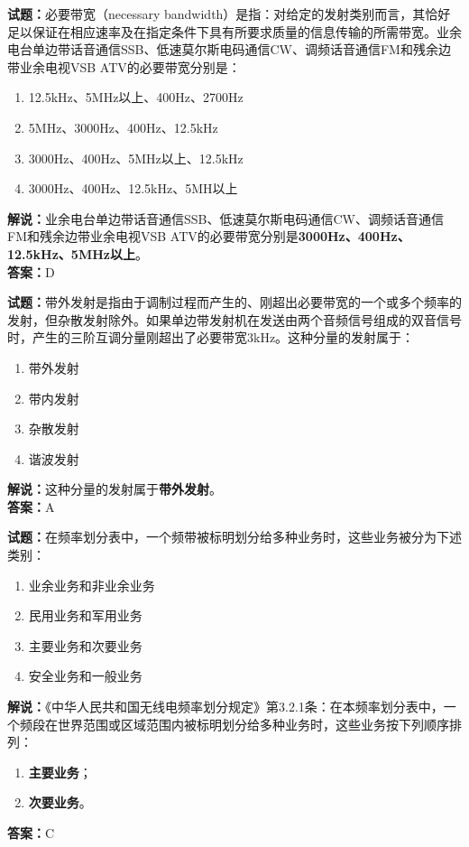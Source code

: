 \documentclass{ctexbook}
\begin{document}
\noindent\textbf{试题：}必要带宽（necessary bandwidth）是指：对给定的发射类别而言，其恰好足以保证在相应速率及在指定条件下具有所要求质量的信息传输的所需带宽。业余电台单边带话音通信SSB、低速莫尔斯电码通信CW、调频话音通信FM和残余边带业余电视VSB ATV的必要带宽分别是：
\begin{enumerate}[leftmargin=3em]
\item 12.5\unit{\kHz}、5\unit{\MHz}以上、400Hz、2700Hz
\item 5\unit{\MHz}、3000Hz、400Hz、12.5\unit{\kHz}
\item 3000Hz、400Hz、5\unit{\MHz}以上、12.5\unit{\kHz}
\item 3000Hz、400Hz、12.5\unit{\kHz}、5MH以上
\end{enumerate}
\noindent\textbf{解说：}业余电台单边带话音通信SSB、低速莫尔斯电码通信CW、调频话音通信FM和残余边带业余电视VSB ATV的必要带宽分别是\textbf{3000Hz、400Hz、12.5\unit{\kHz}、5\unit{\MHz}以上}。\\\noindent\textbf{答案：}D

\bigskip




\noindent\textbf{试题：}带外发射是指由于调制过程而产生的、刚超出必要带宽的一个或多个频率的发射，但杂散发射除外。如果单边带发射机在发送由两个音频信号组成的双音信号时，产生的三阶互调分量刚超出了必要带宽3\unit{\kHz}。这种分量的发射属于：
\begin{enumerate}[leftmargin=3em]
\item 带外发射
\item 带内发射
\item 杂散发射
\item 谐波发射
\end{enumerate}
\noindent\textbf{解说：}这种分量的发射属于\textbf{带外发射}。\\\noindent\textbf{答案：}A


\bigskip




\noindent\textbf{试题：}在频率划分表中，一个频带被标明划分给多种业务时，这些业务被分为下述类别：
\begin{enumerate}[leftmargin=3em]
\item 业余业务和非业余业务
\item 民用业务和军用业务
\item 主要业务和次要业务
\item 安全业务和一般业务
\end{enumerate}
\noindent\textbf{解说：}《中华人民共和国无线电频率划分规定》第3.2.1条：在本频率划分表中，一个频段在世界范围或区域范围内被标明划分给多种业务时，这些业务按下列顺序排列：
\begin{enumerate}[leftmargin=3em, label=\alph*)]
	\item \textbf{主要业务}；
	\item \textbf{次要业务}。
\end{enumerate}
\textbf{答案：}C
\end{document}
